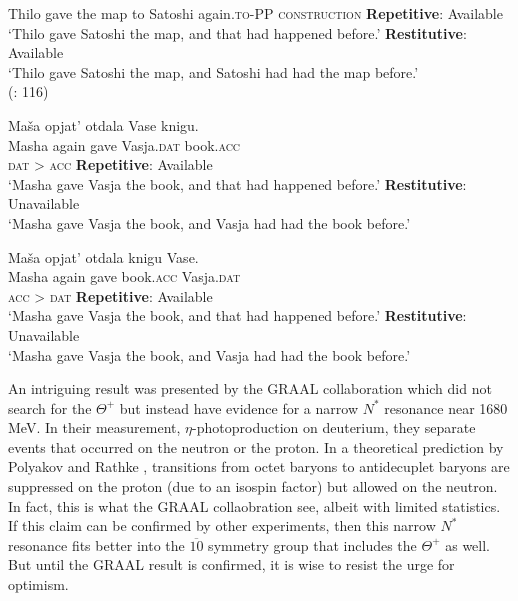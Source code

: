 \documentclass{ws-procs9x6}
\newcommand{\thp}{$\Theta^+$ }
\begin{document}
 \ea\label{ex:bondarenko:4}{Thilo gave the map to Satoshi again.}\hfill\textsc{to-PP construction}
\ea \textbf{Repetitive}: Available\\`Thilo gave Satoshi the map, and that had happened before.'
\ex \textbf{Restitutive}: Available\\`Thilo gave Satoshi the map, and Satoshi had had the map  before.'\\
\hfill (\citealt{Beck-Johnson2004}: 116)
\z
\z

 \ea\label{ex:bondarenko:5}
\gll Maša opjat’ otdala Vase knigu.\\
     Masha again gave Vasja.\textsc{dat} book.\textsc{acc}\\\hfill\textsc{dat} > \textsc{acc}
\ea \textbf{Repetitive}: Available\\`Masha gave Vasja the book, and that had happened before.'
\ex \textbf{Restitutive}: Unavailable\\`Masha gave Vasja the book, and Vasja had had the book   before.'
\z
\z

 \ea\label{ex:bondarenko:6}
\gll Maša opjat’ otdala knigu Vase.\\
     Masha again gave book.\textsc{acc} Vasja.\textsc{dat}\\\hfill\textsc{acc} > \textsc{dat}
\ea \textbf{Repetitive}: Available\\`Masha gave Vasja the book, and that had happened before.'
\ex \textbf{Restitutive}: Unavailable\\`Masha gave Vasja the book, and Vasja had had the book   before.'
\z
\z



An intriguing result was presented by the GRAAL collaboration
\cite{schaerf}
which did not search for the \thp but instead have evidence for a 
narrow $N^*$ resonance near 1680 MeV.  In their measurement, 
$\eta$-photoproduction on deuterium, they separate events that 
occurred on the neutron or the proton.  In a theoretical prediction 
by Polyakov and Rathke \cite{polyakov}, transitions from octet 
baryons to antidecuplet baryons are suppressed on the proton 
(due to an isospin factor) but allowed on the neutron.  In fact, 
this is what the GRAAL collaobration see, albeit with limited 
statistics.  If this claim can be confirmed by other experiments, 
then this narrow $N^*$ resonance fits better into the $\overline{10}$ 
symmetry group that includes the \thp as well.  But until the 
GRAAL result is confirmed, it is wise to resist the urge for optimism.
\end{document}
